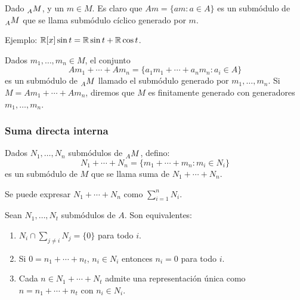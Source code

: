 \begin{df}
  Dado \(\prescript{}{A}{M}\), y un \(m\in M\). Es claro que
  \(Am=\{am:a\in A\}\) es un submódulo de \(\prescript{}{A}{M}\) que se llama submódulo
  cíclico generado por \(m\).
\end{df}

Ejemplo: \(\mathbb{R}[x]\sin t=\mathbb{R}\sin t+\mathbb{R}\cos t\).

\begin{df}
  Dados \(m_1,\ldots, m_n\in M\), el conjunto
  \[
    Am_1+\cdots+Am_n=\{a_1 m_1+\cdots+a_n m_n: a_i\in A\}
  \]
  es un submódulo de \(\prescript{}{A}{M}\) llamado el submódulo generado por
  \(m_1,\ldots, m_n\).
  Si \(M=Am_1+\cdots+Am_n\), diremos que \(M\) es finitamente generado
  con generadores
  \(m_1,\ldots, m_n\).
\end{df}

\subsubsection{Suma directa interna}

\begin{df}
  Dados \(N_1,\ldots, N_n\) submódulos de \(\prescript{}{A}{M}\), defino:
  \[
    N_1+\cdots+ N_n=\{m_1+\cdots+m_n: m_i\in N_i\}
  \]
  es un submódulo de \(M\) que se llama suma de \(N_1+\cdots+N_n\).
\end{df}

\begin{nt}
  Se puede expresar \(N_1+\cdots+ N_n\) como \(\sum_{i=1}^n N_i\).
\end{nt}

\begin{prop}
  Sean \(N_1,\ldots, N_t\) submódulos de \(A\). Son equivalentes:
  \begin{enumerate}
    \item \(N_i\cap\sum_{j\neq i}N_j =\{0\}\) para todo \(i\).
    \item Si \(0=n_1+\cdots+n_t\), \(n_i\in N_i\) entonces \(n_i=0\)
      para todo \(i\).
    \item Cada \(n\in N_1+\cdots+N_t\) admite una representación
      única como \(n=n_1+\cdots+n_t\) con \(n_i\in N_i\).
  \end{enumerate}
\end{prop}
